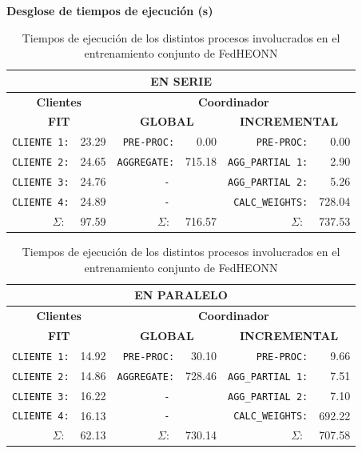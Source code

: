 \documentclass[00-Trabajo_Final.tex]{subfiles}
\begin{document}
\begin{table}[h!]
\centering

\large{\textbf{Desglose de tiempos de ejecución (s)}}
\small
\vspace{0.5cm}
\begin{tabular}{@{}rrrrrr@{}}
\multicolumn{6}{c}{\textbf{EN SERIE}} \\ \midrule
\multicolumn{2}{c}{\textbf{Clientes}} & \multicolumn{4}{c}{\textbf{Coordinador}} \\ \midrule
\multicolumn{2}{c}{\textbf{FIT}}                & \multicolumn{2}{c}{\textbf{GLOBAL}}          & \multicolumn{2}{c}{\textbf{INCREMENTAL}}       \\ \midrule

\verb|CLIENTE 1:| & 23.29 & \verb|PRE-PROC:| & 0.00  & \verb|PRE-PROC:| & 0.00   \\ 
\verb|CLIENTE 2:| & 24.65 & \verb|AGGREGATE:| & 715.18 & \verb|AGG_PARTIAL 1:| & 2.90  \\ 
\verb|CLIENTE 3:| & 24.76 & \multicolumn{2}{c}{\texttt{-}} & \verb|AGG_PARTIAL 2:| & 5.26  \\ 
\verb|CLIENTE 4:| & 24.89 & \multicolumn{2}{c}{\texttt{-}} & \verb|CALC_WEIGHTS:| & 728.04  \\ \bottomrule

$\Sigma:\;$ & 97.59 & $\Sigma:\;$ & 716.57 & $\Sigma:\;$ & 737.53 \\ \hline
\end{tabular}

\vspace{0.2cm}

\begin{tabular}{@{}rrrrrr@{}}
\multicolumn{6}{c}{\textbf{EN PARALELO}} \\ \midrule
\multicolumn{2}{c}{\textbf{Clientes}} & \multicolumn{4}{c}{\textbf{Coordinador}} \\ \midrule
\multicolumn{2}{c}{\textbf{FIT}}                & \multicolumn{2}{c}{\textbf{GLOBAL}}          & \multicolumn{2}{c}{\textbf{INCREMENTAL}}       \\ \midrule

\verb|CLIENTE 1:| & 14.92 & \verb|PRE-PROC:| & 30.10  & \verb|PRE-PROC:| & 9.66   \\ 
\verb|CLIENTE 2:| & 14.86 & \verb|AGGREGATE:| & 728.46 & \verb|AGG_PARTIAL 1:| & 7.51  \\ 
\verb|CLIENTE 3:| & 16.22 & \multicolumn{2}{c}{\texttt{-}} & \verb|AGG_PARTIAL 2:| & 7.10  \\ 
\verb|CLIENTE 4:| & 16.13 & \multicolumn{2}{c}{\texttt{-}} & \verb|CALC_WEIGHTS:| & 692.22  \\ \bottomrule

$\Sigma:\;$ & 62.13 & $\Sigma:\;$ & 730.14 & $\Sigma:\;$ & 707.58 \\ \hline
\end{tabular}
\normalsize
\caption{Tiempos de ejecución de los distintos procesos involucrados en el entrenamiento conjunto de FedHEONN}
\label{tbl:tabla_tiempos_paralelo}
\end{table}
\end{document}
